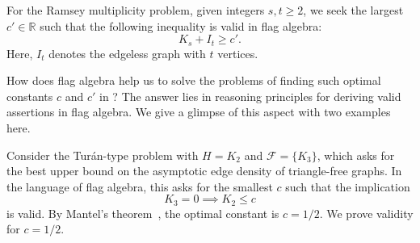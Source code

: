 \documentclass{article}
\begin{document}
For the Ramsey multiplicity problem, given integers $s,t \geq 2$, we seek the largest $c' \in \mathbb{R}$ such that the following inequality is valid in flag algebra:
\begin{equation}
  \label{eqn:ramsey-assertion}
K_s + I_t \geq c'.
\end{equation}
Here, $I_t$ denotes the edgeless graph with $t$ vertices.

How does flag algebra help us to solve the problems of finding such optimal constants $c$ and $c'$ in ?
The answer lies in reasoning principles for deriving valid assertions in flag algebra. 
We give a glimpse of this aspect with two examples here.

Consider the Tur\'an-type problem with $H = K_2$ and $\mathcal{F} = \{K_3\}$, which asks for the best upper bound on the asymptotic edge density of triangle-free graphs.
In the language of flag algebra, this asks for the smallest $c$ such that the implication
\[
K_3 = 0 \implies K_2 \leq c
\]
is valid.
By Mantel's theorem~\cite{Mantel1907}, the optimal constant is $c = 1/2$.
We prove validity for $c = 1/2$.
\end{document}

